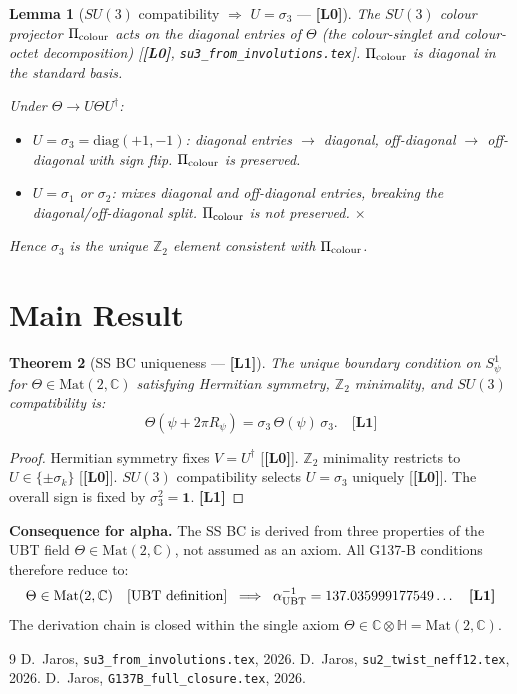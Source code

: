 \documentclass[12pt,a4paper]{article}
\newtheorem{theorem}{Theorem}[section]
\newtheorem{lemma}[theorem]{Lemma}
\theoremstyle{remark}\newtheorem{remark}[theorem]{Remark}
\newcommand{\Lz}{\textbf{[L0]}}
\newcommand{\Lo}{\textbf{[L1]}}
\begin{document}
\begin{lemma}[$SU(3)$ compatibility $\Rightarrow$ $U=\sigma_3$ — \Lz]
The $SU(3)$ colour projector $\Pi_{\rm colour}$ acts on the
diagonal entries of $\Theta$ (the colour-singlet and colour-octet
decomposition) [\Lz, \texttt{su3\_from\_involutions.tex}].
$\Pi_{\rm colour}$ is diagonal in the standard basis.

Under $\Theta\to U\Theta U^\dagger$:
\begin{itemize}
\item $U=\sigma_3=\mathrm{diag}(+1,-1)$: diagonal entries $\to$
  diagonal, off-diagonal $\to$ off-diagonal with sign flip.
  $\Pi_{\rm colour}$ is preserved. \checkmark
\item $U=\sigma_1$ or $\sigma_2$: mixes diagonal and off-diagonal
  entries, breaking the diagonal/off-diagonal split.
  $\Pi_{\rm colour}$ is not preserved. $\times$
\end{itemize}
Hence $\sigma_3$ is the unique $\mathbb{Z}_2$ element consistent with
$\Pi_{\rm colour}$.
\end{lemma}

\section{Main Result}

\begin{theorem}[SS BC uniqueness — \Lo]
\label{thm:SSBC}
The unique boundary condition on $S^1_\psi$ for
$\Theta\in\mathrm{Mat}(2,\mathbb C)$ satisfying Hermitian symmetry,
$\mathbb{Z}_2$ minimality, and $SU(3)$ compatibility is:
\[
  \Theta(\psi+2\pi R_\psi) = \sigma_3\,\Theta(\psi)\,\sigma_3. \quad \Lo
\]
\end{theorem}

\begin{proof}
Hermitian symmetry fixes $V=U^\dagger$ [\Lz].
$\mathbb{Z}_2$ minimality restricts to $U\in\{\pm\sigma_k\}$ [\Lz].
$SU(3)$ compatibility selects $U=\sigma_3$ uniquely [\Lz].
The overall sign is fixed by $\sigma_3^2=\mathbf{1}$. \Lo
\end{proof}

\begin{resultbox}
\textbf{Consequence for alpha.}
The SS BC is derived from three properties of the UBT field
$\Theta\in\mathrm{Mat}(2,\mathbb C)$, not assumed as an axiom.
All G137-B conditions therefore reduce to:
\[
  \Theta\in\mathrm{Mat}(2,\mathbb C) \quad [\text{UBT definition}]
  \;\;\Longrightarrow\;\;
  \alpha^{-1}_{\rm UBT} = 137.035999177549\ldots \quad \Lo
\]
The derivation chain is closed within the single axiom
$\Theta\in\mathbb{C}\otimes\mathbb{H}=\mathrm{Mat}(2,\mathbb C)$.
\end{resultbox}

\begin{thebibliography}{9}
  D.~Jaros, \texttt{su3\_from\_involutions.tex}, 2026.
  D.~Jaros, \texttt{su2\_twist\_neff12.tex}, 2026.
  D.~Jaros, \texttt{G137B\_full\_closure.tex}, 2026.
\end{thebibliography}

\ifdefined\INCLUDEMODE\else
\end{document}
